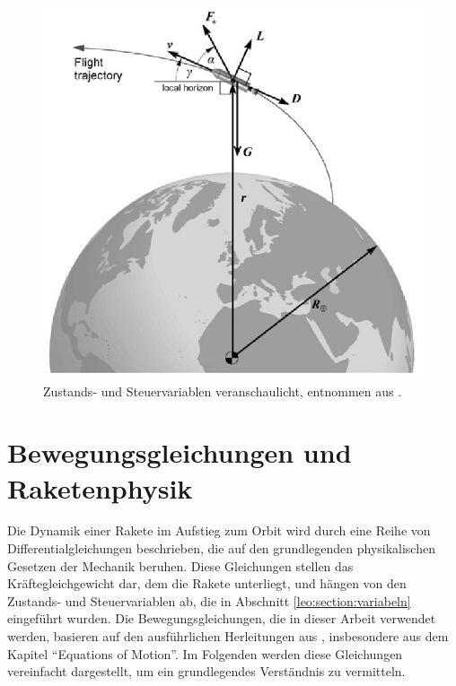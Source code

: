 \begin{figure}
	\centering
	\includegraphics[width=0.65\linewidth]{papers/leo/Grafiken/forces.png}
	\caption{Zustands- und Steuervariablen veranschaulicht, entnommen aus \cite{leo:astronautics}.}
	\label{fig:leo:forces}
\end{figure}



\section{Bewegungsgleichungen und Raketenphysik \label{leo:section:beweungsgleichungen}}

Die Dynamik einer Rakete im Aufstieg zum Orbit wird durch eine Reihe von Differentialgleichungen beschrieben, die auf den grundlegenden physikalischen Gesetzen der Mechanik beruhen. 
Diese Gleichungen stellen das Kräftegleichgewicht dar, dem die Rakete unterliegt, und hängen von den Zustands- und Steuervariablen ab, die in Abschnitt \ref{leo:section:variabeln} eingeführt wurden. 
Die Bewegungsgleichungen, die in dieser Arbeit verwendet werden, basieren auf den ausführlichen Herleitungen aus \cite{leo:astronautics}, insbesondere aus dem Kapitel ``Equations of Motion''. 
Im Folgenden werden diese Gleichungen vereinfacht dargestellt, um ein grundlegendes Verständnis zu vermitteln.

